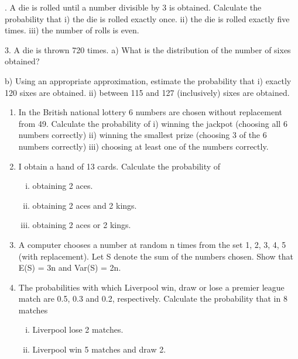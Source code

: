 \documentclass[a4paper,12pt]{article}
\begin{document}
.	A die is rolled until a number divisible by 3 is obtained. Calculate the probability that
i)	the die is rolled exactly once.
ii)	the die is rolled exactly five times.
iii)	the number of rolls is even.


3.	A die is thrown 720 times.
a)	What is the distribution of the number of sixes obtained?

b) Using an appropriate approximation, estimate the probability that
i) exactly 120 sixes are obtained.
ii) between 115 and 127 (inclusively) sixes are obtained.



	
	
	
\begin{enumerate}	
	
	\item In the British national lottery 6 numbers are chosen without replacement from 49. Calculate the probability of 
	i)	winning the jackpot (choosing all 6 numbers correctly)
	ii)	winning the smallest prize (choosing 3 of the 6 numbers correctly)
	iii)	choosing at least one of the numbers correctly.
	
	\item	I obtain a hand of 13 cards. Calculate the probability of
	\begin{enumerate}[(i)]
		\item obtaining 2 aces.
		\item obtaining 2 aces and 2 kings.
		\item obtaining 2 aces or 2 kings.	
	\end{enumerate}
	
	
	\item A computer chooses a number at random n times from the set {1, 2, 3, 4, 5} (with replacement). Let S denote the sum of the numbers chosen. Show that
	E(S) = 3n and Var(S) = 2n.
	
	
	
	
	\item	The probabilities with which Liverpool win, draw or lose a premier league match are 0.5, 0.3 and 0.2, respectively. Calculate the probability that in 8 matches
	\begin{enumerate}[(i)]
		\item 	Liverpool lose 2 matches.
		\item	Liverpool win 5 matches and draw 2.
	\end{enumerate}
	

\end{enumerate}
\end{document}
